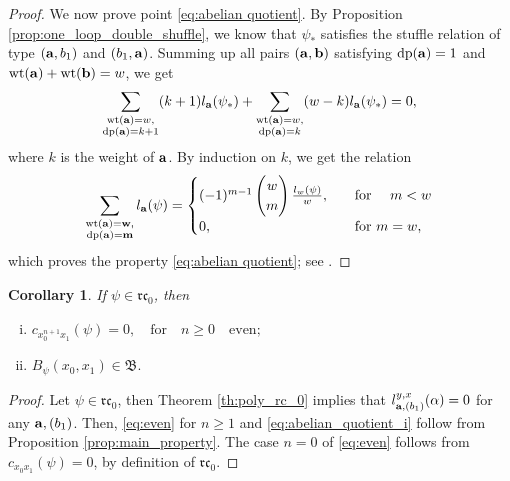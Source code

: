 \documentclass[a4paper,fleqn]{cas-sc}
\newtheorem{corollary}[theorem]{Corollary}
\DeclareMathOperator{\dep}{dp}
\begin{document}
\begin{proof}
We now prove point \eqref{eq:abelian quotient}. By Proposition \ref{prop:one_loop_double_shuffle}, we know that $\psi_{*}$ satisfies the stuffle relation of type $({\bf{a}},b_1)$ and $(b_1,{\bf{a}})$. Summing up all pairs $(\bf{a},\bf{b})$ satisfying $\dep({\bf{a}})=1$ and $\text{wt}({\bf{a}})+\text{wt}({\bf{b}})=w$, we get
$$
	\sum_{\substack{\text{wt}({\bf{a}})=w,\\\text{dp}({\bf{a}})=k+1}}(k+1)l_{\bf{a}}(\psi_{*})+\sum_{\substack{\text{wt}({\bf{a}})=w,\\ \text{dp}({\bf{a}})=k}}(w-k)l_{\bf{a}}(\psi_{*})=0,
$$
where $k$ is the weight of $\bold a$. By induction on $k$, we get the relation
$$
	\sum_{\substack{\text{wt}(\bf{a})=w,\\ \text{dp}(\bf{a})=m}}l_{\bf{a}}(\psi)=\begin{cases}
		(-1)^{m-1}\begin{pmatrix}
			w\\m
		\end{pmatrix}\frac{l_{w}(\psi)}{w}, & \quad \text{for \quad $m<w$}\\
		0, &\quad \text{for $m=w$},
	\end{cases}
$$
which proves the property \eqref{eq:abelian quotient}; see \cite[Lemma 5.3]{Furusho2011}.
\end{proof}


\begin{corollary} \label{prop:c-b-rc0}
    If $\psi\in \mathfrak{rc}_0$, then
    \begin{enumerate}[(i)]
        \item \label{eq:even} $c_{x_0^{n+1}x_1}(\psi)=0, \quad \text{for}\quad n\ge 0\quad\text{even};$
        \item \label{eq:abelian_quotient_i} $B_{\psi}(x_0,x_1)\in \mathfrak{B}.$
    \end{enumerate}
\end{corollary}

\begin{proof}
Let $\psi\in \mathfrak{rc}_0$, then Theorem \ref{th:poly_rc_0} implies that $l^{y,x}_{{\bf{a}},(b_1)}(\alpha)=0$ for any ${\bf{a}}, (b_1)$. Then, \eqref{eq:even} for $n\ge 1$ and \eqref{eq:abelian_quotient_i} follow from Proposition \ref{prop:main_property}. The case $n=0$ of \eqref{eq:even} follows from $c_{x_0x_1}(\psi)=0$, by definition of $\mathfrak{rc}_0$. 
\end{proof}
\end{document}
